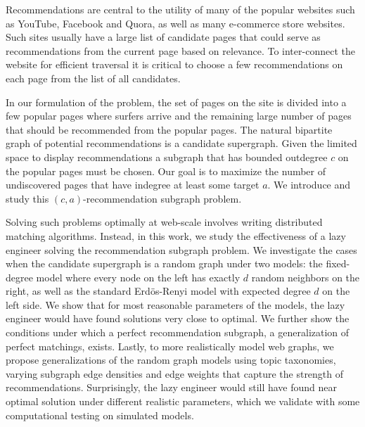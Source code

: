 \abstract

Recommendations are central to the utility of many of the popular
websites such as YouTube, Facebook and Quora, as well as many
e-commerce store websites. Such sites usually have a large list of
candidate pages that could serve as recommendations from the current
page based on relevance. To inter-connect the website for efficient
traversal it is critical to choose a few recommendations on each
page from the list of all candidates.

In our formulation of the problem, the set of pages on the site is
divided into a few popular pages where surfers arrive and the
remaining large number of pages that should be recommended from the
popular pages. The natural bipartite graph of potential
recommendations is a candidate supergraph. Given the limited space to
display recommendations a subgraph that has bounded outdegree $c$ on the
popular pages must be chosen. Our goal is to maximize the number of
undiscovered pages that have indegree at least some target $a$. We introduce and study this
$(c, a)$-recommendation subgraph problem.

Solving such problems optimally at web-scale involves writing distributed matching algorithms.
Instead, in this work, we study the effectiveness of a lazy engineer
solving the recommendation subgraph problem. We investigate the cases
when the candidate supergraph is a random graph under two models: the
fixed-degree model where every node on the left has exactly $d$ random
neighbors on the right, as well as the standard Erd\"{o}s-Renyi model
with expected degree $d$ on the left side. We show that for most
reasonable parameters of the models, the lazy engineer would have
found solutions very close to optimal. We further show the conditions
under which a perfect recommendation subgraph, a generalization of
perfect matchings, exists. Lastly, to more realistically model web
graphs, we propose generalizations of the random graph models using
topic taxonomies, varying subgraph edge densities and edge weights
that capture the strength of recommendations. Surprisingly, the lazy engineer would
still have found near optimal solution under different realistic parameters, which we validate with some computational testing on simulated models. 